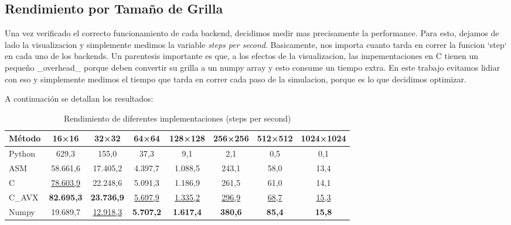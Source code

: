 \documentclass[a4paper]{article}
\begin{document}
\subsection{Rendimiento por Tamaño de Grilla}
Una vez verificado el correcto funcionamiento de cada backend, decidimos medir mas precisamente la performance. Para esto, dejamos de lado la visualizacion y simplemente
medimos la variable \textit{steps per second}. Basicamente, nos importa cuanto tarda en correr la funcion `step` en cada uno de los backends. Un parentesis importante es
que, a los efectos de la visualizacion, las impementaciones en C tienen un pequeño _overhead_ porque deben convertir su grilla a un numpy array y esto consume un tiempo extra.
En este trabajo evitamos lidiar con eso y simplemente medimos el tiempo que tarda en correr cada paso de la simulacion, porque es lo que decidimos optimizar.

A continuación se detallan los resultados:

\begin{table}[h]
    \centering
    \caption{Rendimiento de diferentes implementaciones (steps per second)}
    \label{tab:performance_results}
    \begin{tabular}{lccccccc}
        \toprule
        \textbf{Método} & \textbf{16×16}       & \textbf{32×32}       & \textbf{64×64}      & \textbf{128×128}    & \textbf{256×256}  & \textbf{512×512} & \textbf{1024×1024} \\
        \midrule
        Python          & 629,3                & 155,0                & 37,3                & 9,1                 & 2,1               & 0,5              & 0,1                \\
        ASM             & 58.661,6             & 17.405,2             & 4.397,7             & 1.088,5             & 243,1             & 58,0             & 13,4               \\
        C               & \underline{78.603,9} & 22.248,6             & 5.091,3             & 1.186,9             & 261,5             & 61,0             & 14,1               \\
        C\_AVX          & \textbf{82.695,3}    & \textbf{23.736,9}    & \underline{5.697,9} & \underline{1.335,2} & \underline{296,9} & \underline{68,7} & \underline{15,3}   \\
        Numpy           & 19.689,7             & \underline{12.918,3} & \textbf{5.707,2}    & \textbf{1.617,4}    & \textbf{380,6 }   & \textbf{85,4}    & \textbf{15,8}      \\
        \bottomrule
    \end{tabular}
\end{table}
\end{document}
